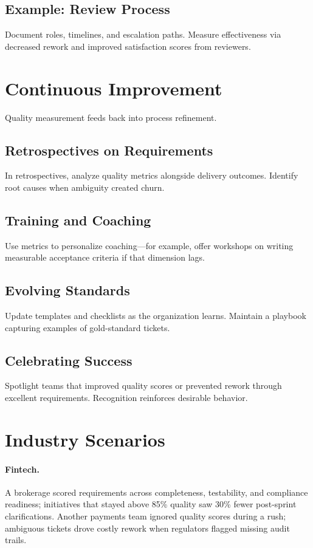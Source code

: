 \subsection{Example: Review Process}
Document roles, timelines, and escalation paths. Measure effectiveness via decreased rework and improved satisfaction scores from reviewers.

\section{Continuous Improvement}
\label{sec:req-continuous-improvement}

Quality measurement feeds back into process refinement.

\subsection{Retrospectives on Requirements}
In retrospectives, analyze quality metrics alongside delivery outcomes. Identify root causes when ambiguity created churn.

\subsection{Training and Coaching}
Use metrics to personalize coaching—for example, offer workshops on writing measurable acceptance criteria if that dimension lags.

\subsection{Evolving Standards}
Update templates and checklists as the organization learns. Maintain a playbook capturing examples of gold-standard tickets.

\subsection{Celebrating Success}
Spotlight teams that improved quality scores or prevented rework through excellent requirements. Recognition reinforces desirable behavior.

\section{Industry Scenarios}
\label{sec:quality-examples}

\paragraph{Fintech.} A brokerage scored requirements across completeness, testability, and compliance readiness; initiatives that stayed above 85\% quality saw 30\% fewer post-sprint clarifications. Another payments team ignored quality scores during a rush; ambiguous tickets drove costly rework when regulators flagged missing audit trails.

